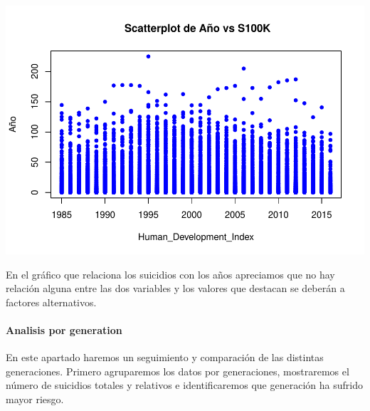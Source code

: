 \documentclass[]{article}
\newenvironment{Shaded}{\begin{snugshade}}{\end{snugshade}}
\newcommand{\CommentTok}[1]{\textcolor[rgb]{0.56,0.35,0.01}{\textit{#1}}}
\let\oldparagraph\paragraph
\renewcommand{\paragraph}[1]{\oldparagraph{#1}\mbox{}}
\begin{document}
\includegraphics{Informe_files/figure-latex/unnamed-chunk-22-1.pdf}

En el gráfico que relaciona los suicidios con los años apreciamos que no
hay relación alguna entre las dos variables y los valores que destacan
se deberán a factores alternativos.

\hypertarget{analisis-por-generation}{%
\paragraph{Analisis por generation}\label{analisis-por-generation}}

En este apartado haremos un seguimiento y comparación de las distintas
generaciones. Primero agruparemos los datos por generaciones,
mostraremos el número de suicidios totales y relativos e identificaremos
que generación ha sufrido mayor riesgo.

\begin{Shaded}
\end{Shaded}

\begin{Shaded}
\end{Shaded}
\end{document}
